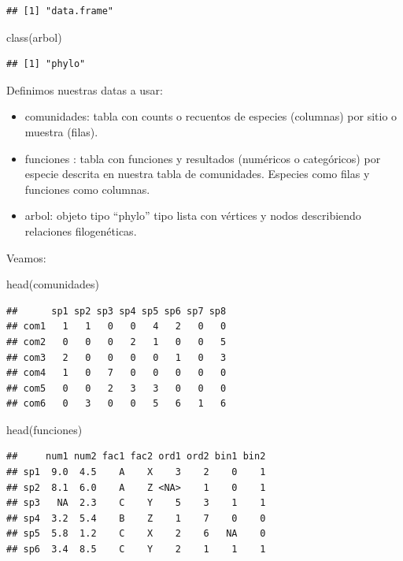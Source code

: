 \documentclass[
]{article}
\newenvironment{Shaded}{\begin{snugshade}}{\end{snugshade}}
\newcommand{\FunctionTok}[1]{\textcolor[rgb]{0.00,0.00,0.00}{#1}}
\newcommand{\NormalTok}[1]{#1}
\begin{document}
\begin{verbatim}
## [1] "data.frame"
\end{verbatim}

\begin{Shaded}
\begin{Highlighting}[]
\FunctionTok{class}\NormalTok{(arbol)}
\end{Highlighting}
\end{Shaded}

\begin{verbatim}
## [1] "phylo"
\end{verbatim}

Definimos nuestras datas a usar:

\begin{itemize}
\item
  comunidades: tabla con counts o recuentos de especies (columnas) por
  sitio o muestra (filas).
\item
  funciones : tabla con funciones y resultados (numéricos o categóricos)
  por especie descrita en nuestra tabla de comunidades. Especies como
  filas y funciones como columnas.
\item
  arbol: objeto tipo ``phylo'' tipo lista con vértices y nodos
  describiendo relaciones filogenéticas.
\end{itemize}

Veamos:

\begin{Shaded}
\begin{Highlighting}[]
\FunctionTok{head}\NormalTok{(comunidades)}
\end{Highlighting}
\end{Shaded}

\begin{verbatim}
##      sp1 sp2 sp3 sp4 sp5 sp6 sp7 sp8
## com1   1   1   0   0   4   2   0   0
## com2   0   0   0   2   1   0   0   5
## com3   2   0   0   0   0   1   0   3
## com4   1   0   7   0   0   0   0   0
## com5   0   0   2   3   3   0   0   0
## com6   0   3   0   0   5   6   1   6
\end{verbatim}

\hfill\break

\begin{Shaded}
\begin{Highlighting}[]
\FunctionTok{head}\NormalTok{(funciones)}
\end{Highlighting}
\end{Shaded}

\begin{verbatim}
##     num1 num2 fac1 fac2 ord1 ord2 bin1 bin2
## sp1  9.0  4.5    A    X    3    2    0    1
## sp2  8.1  6.0    A    Z <NA>    1    0    1
## sp3   NA  2.3    C    Y    5    3    1    1
## sp4  3.2  5.4    B    Z    1    7    0    0
## sp5  5.8  1.2    C    X    2    6   NA    0
## sp6  3.4  8.5    C    Y    2    1    1    1
\end{verbatim}
\end{document}
